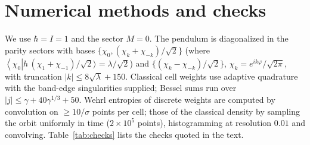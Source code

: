 \documentclass[pra,twocolumn,superscriptaddress,longbibliography,floatfix]{revtex4-2}
\newcommand{\bra}[1]{\left\langle#1\right|}
\begin{document}
\section{Numerical methods and checks}
\label{app:num}

We use $\hbar=I=1$ and the sector $M=0$. The pendulum is diagonalized in the
parity sectors with bases $\{\chi_{0},(\chi_{k}+\chi_{-k})/\sqrt2\}$ (where
$\bra{\chi_{0}}h\,(\chi_{1}+\chi_{-1})/\sqrt2\rangle=\lambda/\sqrt2$) and
$\{(\chi_{k}-\chi_{-k})/\sqrt2\}$, $\chi_{k}=e^{ik\varphi}/\sqrt{2\pi}$, with
truncation $|k|\le8\sqrt\lambda+150$. Classical cell weights use adaptive
quadrature with the band-edge singularities supplied; Bessel sums run over
$|j|\le\gamma+40\gamma^{1/3}+50$. Wehrl entropies of discrete weights are
computed by convolution on $\ge10/\sigma$ points per cell; those of the classical
density by sampling the orbit uniformly in time ($2\times10^{5}$ points),
histogramming at resolution $0.01$ and convolving. Table~\ref{tab:checks} lists
the checks quoted in the text.
\end{document}
